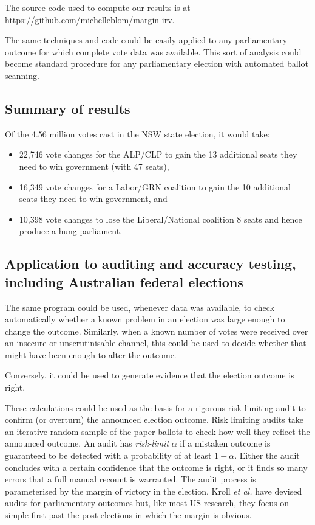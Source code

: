 \documentclass{article}
\begin{document}
The source code used to compute our results is at  \url{https://github.com/michelleblom/margin-irv}.

The same techniques and code could be easily applied to any parliamentary outcome for which complete vote data was available.  This sort of analysis could become standard procedure for any parliamentary election with automated ballot scanning. 

\subsection{Summary of results}

Of the 4.56 million votes cast in the NSW state election, it would take:
\begin{itemize}
\item 22,746 vote changes for the ALP/CLP to gain the 13 additional seats they need to win government (with 47 seats),
\item 16,349 vote changes for a Labor/GRN coalition to gain the 10 additional seats they need to win government, and
\item 10,398 vote changes to lose the Liberal/National coalition 8 seats and hence produce a hung parliament.
\end{itemize}

\subsection{Application to auditing and accuracy testing, including Australian federal elections}

The same program could be used, whenever data was available, to check automatically whether a known problem in an election was large enough to change the outcome.  Similarly, when a known number of votes were received over an insecure or unscrutinisable channel,  this could be used to decide whether that might have been enough to alter the outcome. 

Conversely, it could be used to generate evidence that the election outcome is right.

These calculations could be used as the basis for a rigorous risk-limiting audit  to confirm (or overturn) the announced election outcome.  Risk limiting audits \citep{lindeman2012gentle} take an iterative random sample of the paper ballots to check how well they reflect the announced outcome.  An audit has \emph{risk-limit} $\alpha$ if a mistaken outcome is guaranteed to be detected with a probability of at least $1-\alpha$.  Either the audit concludes with a certain confidence that the outcome is right, or it finds so many errors that a full manual recount is warranted.   The audit process is parameterised by the margin of victory in the election.   Kroll {\it et al.} \cite{kroll1001efficiently} have devised audits for parliamentary outcomes but, like most US research, they  focus on simple first-past-the-post elections in which the margin is obvious.
\end{document}

